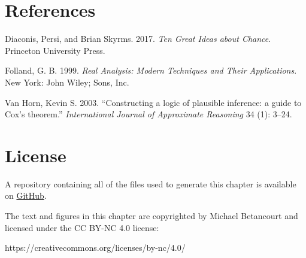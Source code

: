 \documentclass[
  letterpaper,
  DIV=11,
  numbers=noendperiod]{scrartcl}
\newlength{\cslhangindent}
\newlength{\cslentryspacingunit} %
\newenvironment{CSLReferences}[2] %
 {%
  \setlength{\parindent}{0pt}
  \ifodd #1
  \let\oldpar\par
  \def\par{\hangindent=\cslhangindent\oldpar}
  \fi
  \setlength{\parskip}{#2\cslentryspacingunit}
 }%
 {}
\begin{document}
\hypertarget{references}{%
\section*{References}\label{references}}

\hypertarget{refs}{}
\begin{CSLReferences}{1}{0}
\leavevmode{}%
Diaconis, Persi, and Brian Skyrms. 2017. \emph{Ten Great Ideas about
Chance}. Princeton University Press.

\leavevmode{}%
Folland, G. B. 1999. \emph{Real Analysis: Modern Techniques and Their
Applications}. New York: John Wiley; Sons, Inc.

\leavevmode{}%
Van Horn, Kevin S. 2003. {``{Constructing a logic of plausible
inference: a guide to {C}ox's theorem}.''} \emph{{International Journal
of Approximate Reasoning}} 34 (1): 3--24.

\end{CSLReferences}

\hypertarget{license}{%
\section*{License}\label{license}}

A repository containing all of the files used to generate this chapter
is available on
\href{https://github.com/betanalpha/quarto_chapters/tree/main/probability_on_general_spaces}{GitHub}.

The text and figures in this chapter are copyrighted by Michael
Betancourt and licensed under the CC BY-NC 4.0 license:

https://creativecommons.org/licenses/by-nc/4.0/
\end{document}
